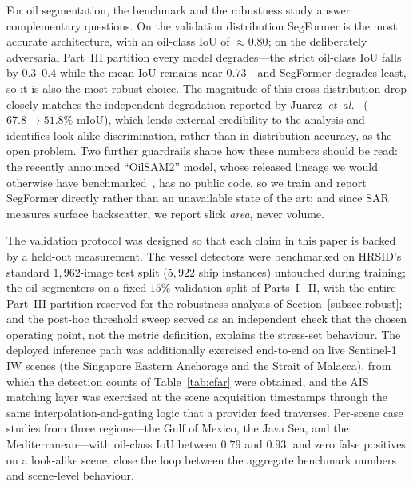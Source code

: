\documentclass{ieeeaccess}
\begin{document}
For oil segmentation, the benchmark and the robustness study answer complementary questions. On the validation distribution SegFormer is the most accurate architecture, with an oil-class IoU of $\approx0.80$; on the deliberately adversarial Part~III partition every model degrades---the strict oil-class IoU falls by $0.3$--$0.4$ while the mean IoU remains near $0.73$---and SegFormer degrades least, so it is also the most robust choice. The magnitude of this cross-distribution drop closely matches the independent degradation reported by Juarez~\textit{et~al.}~\cite{14} ($67.8\!\rightarrow\!51.8\%$ mIoU), which lends external credibility to the analysis and identifies look-alike discrimination, rather than in-distribution accuracy, as the open problem. Two further guardrails shape how these numbers should be read: the recently announced ``OilSAM2'' model, whose released lineage we would otherwise have benchmarked~\cite{12}, has no public code, so we train and report SegFormer directly rather than an unavailable state of the art; and since SAR measures surface backscatter, we report slick \emph{area}, never volume.

The validation protocol was designed so that each claim in this paper is backed by a held-out measurement. The vessel detectors were benchmarked on HRSID's standard $1{,}962$-image test split ($5{,}922$ ship instances) untouched during training; the oil segmenters on a fixed $15\%$ validation split of Parts~I+II, with the entire Part~III partition reserved for the robustness analysis of Section~\ref{subsec:robust}; and the post-hoc threshold sweep served as an independent check that the chosen operating point, not the metric definition, explains the stress-set behaviour. The deployed inference path was additionally exercised end-to-end on live Sentinel-1 IW scenes (the Singapore Eastern Anchorage and the Strait of Malacca), from which the detection counts of Table~\ref{tab:cfar} were obtained, and the AIS matching layer was exercised at the scene acquisition timestamps through the same interpolation-and-gating logic that a provider feed traverses. Per-scene case studies from three regions---the Gulf of Mexico, the Java Sea, and the Mediterranean---with oil-class IoU between $0.79$ and $0.93$, and zero false positives on a look-alike scene, close the loop between the aggregate benchmark numbers and scene-level behaviour.
\end{document}
